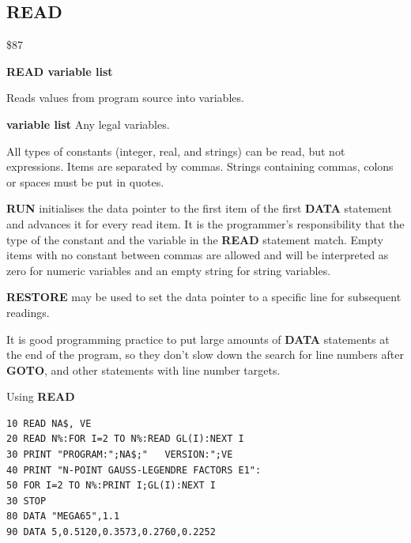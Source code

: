 \subsection{READ}
\begin{description}[leftmargin=2cm,style=nextline]
\item [Token:] \$87
\item [Format:] {\bf READ variable list}
\item [Usage:]  Reads values from program source into variables.

               {\bf variable list} Any legal variables.

               All types of constants (integer, real, and
               strings) can be read, but not expressions.
               Items are separated by commas.
               Strings containing commas, colons or spaces must be put
               in quotes.

               {\bf RUN} initialises the data pointer
               to the first item of the first {\bf DATA} statement
               and advances it for every read item. It is the
               programmer's responsibility that the type of
               the constant and the variable in the {\bf READ}
               statement match. Empty items with no constant
               between commas are allowed and will be interpreted as
               zero for numeric variables and an empty string for
               string variables.

               {\bf RESTORE} may be used to set the
               data pointer to a specific line for subsequent
               readings.

\item [Remarks:] It is good programming practice to put large amounts of
                 {\bf DATA} statements at the end of the program,
                 so they don't slow down the search for line numbers
                 after {\bf GOTO}, and other statements with line number targets.

\item [Example:] Using {\bf READ}
\begin{tcolorbox}[colback=black,coltext=white]
\verbatimfont{\codefont}
\begin{verbatim}
10 READ NA$, VE
20 READ N%:FOR I=2 TO N%:READ GL(I):NEXT I
30 PRINT "PROGRAM:";NA$;"   VERSION:";VE
40 PRINT "N-POINT GAUSS-LEGENDRE FACTORS E1":
50 FOR I=2 TO N%:PRINT I;GL(I):NEXT I
30 STOP
80 DATA "MEGA65",1.1
90 DATA 5,0.5120,0.3573,0.2760,0.2252
\end{verbatim}
\end{tcolorbox}
\end{description}

